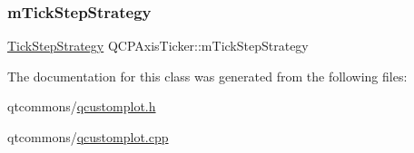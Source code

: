 \subsubsection{\texorpdfstring{mTickStepStrategy}{mTickStepStrategy}}
{\footnotesize\ttfamily \mbox{\hyperlink{class_q_c_p_axis_ticker_ab6d2f9d9477821623ac9bc4b21ddf49a}{Tick\+Step\+Strategy}} Q\+C\+P\+Axis\+Ticker\+::m\+Tick\+Step\+Strategy\hspace{0.3cm}{\ttfamily [protected]}}



The documentation for this class was generated from the following files\+:\begin{DoxyCompactItemize}
\item 
qtcommons/\mbox{\hyperlink{qcustomplot_8h}{qcustomplot.\+h}}\item 
qtcommons/\mbox{\hyperlink{qcustomplot_8cpp}{qcustomplot.\+cpp}}\end{DoxyCompactItemize}
